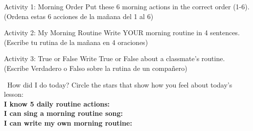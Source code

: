 \begin{activity}{Activity 1: Morning Order}
  Put these 6 morning actions in the correct order (1-6). (Ordena estas 6 acciones de la mañana del 1 al 6)
  \writinglines[3]
\end{activity}

\begin{activity}{Activity 2: My Morning Routine}
  Write YOUR morning routine in 4 sentences. (Escribe tu rutina de la mañana en 4 oraciones)
  \writinglines[4]
\end{activity}

\begin{activity}{Activity 3: True or False}
  Write True or False about a classmate's routine. (Escribe Verdadero o Falso sobre la rutina de un compañero)
  \writinglines[3]
\end{activity}

\vspace{1em}
\begin{grammartip}{ \ How did I do today?}
  Circle the stars that show how you feel about today's lesson:\\[6pt]
  \textbf{I know 5 daily routine actions:} \selfcheck[0] \\[4pt]
  \textbf{I can sing a morning routine song:} \selfcheck[0] \\[4pt]
  \textbf{I can write my own morning routine:} \selfcheck[0]
\end{grammartip}
